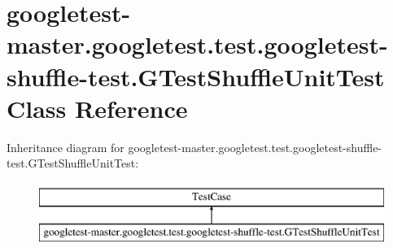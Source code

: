 \hypertarget{classgoogletest-master_1_1googletest_1_1test_1_1googletest-shuffle-test_1_1_g_test_shuffle_unit_test}{}\section{googletest-\/master.googletest.\+test.\+googletest-\/shuffle-\/test.G\+Test\+Shuffle\+Unit\+Test Class Reference}
\label{classgoogletest-master_1_1googletest_1_1test_1_1googletest-shuffle-test_1_1_g_test_shuffle_unit_test}
Inheritance diagram for googletest-\/master.googletest.\+test.\+googletest-\/shuffle-\/test.G\+Test\+Shuffle\+Unit\+Test\+:\begin{figure}[H]
\begin{center}
\leavevmode
\includegraphics[height=2.000000cm]{d1/d20/classgoogletest-master_1_1googletest_1_1test_1_1googletest-shuffle-test_1_1_g_test_shuffle_unit_test}
\end{center}
\end{figure}
